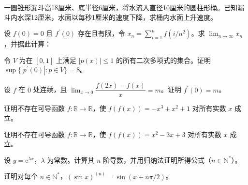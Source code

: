 \newpage
\noindent\begin{minipage}{\textwidth}
一圆锥形漏斗高18厘米、底半径6厘米，将水流入直径10厘米的圆柱形桶。已知漏斗内水深12厘米，水面以每秒1厘米的速度下降，求桶内水面上升速度。
\end{minipage}\par\vfill
\noindent\begin{minipage}{\textwidth}
设 $f(0)=0$ 且 $f^{\prime}(0)$ 存在且有限，令 $x_n=\sum_{i=1}^n f(i/n^2)$。求 $\lim_{n\to\infty}x_n$，并据此计算：
\end{minipage}\par\vfill
\noindent\begin{minipage}{\textwidth}
令 $V$ 为在 $[0,1]$ 上满足 $|p(x)|\le1$ 的所有二次多项式的集合。证明 $\sup\{|p^{\prime}(0)|:p\in V\}=8$。
\end{minipage}\par\vfill
\newpage
\noindent\begin{minipage}{\textwidth}
设 $f$ 在 $0$ 处连续，且 $\lim_{x\to0}\dfrac{f(2x)-f(x)}x=m$。证明 $f^{\prime}(0)=m$。
\end{minipage}\par\vfill
\noindent\begin{minipage}{\textwidth}
证明不存在可导函数 $f:\mathbb R\to\mathbb R$，使 $f(f(x))=-x^3+x^2+1$ 对所有实数 $x$ 成立。
\end{minipage}\par\vfill
\noindent\begin{minipage}{\textwidth}
证明不存在可导函数 $f:\mathbb R\to\mathbb R$，使 $f(f(x))=x^2-3x+3$ 对所有实数 $x$ 成立。
\end{minipage}\par\vfill
\newpage
\noindent\begin{minipage}{\textwidth}
设 $y=\mathrm e^{\lambda x}$，$\lambda$ 为常数。计算其 $n$ 阶导数，并用归纳法证明所得公式（$n\in\mathbb N^*$）。
\end{minipage}\par\vfill
\noindent\begin{minipage}{\textwidth}
证明对每个 $n\in\mathbb N^*$，$(\sin x)^{(n)}=\sin(x+n\pi/2)$。
\end{minipage}\par\vfill

